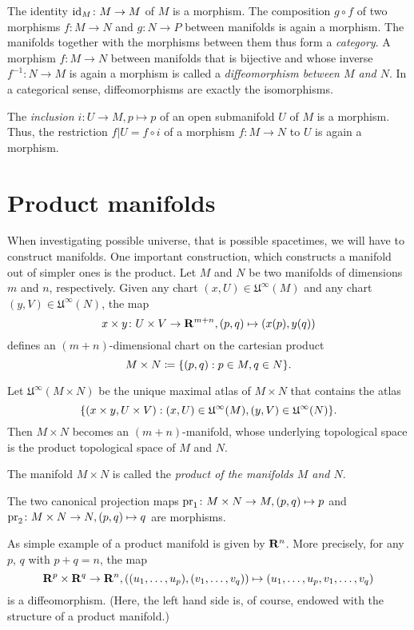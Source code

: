 The identity $\mathrm{id}_M\colon M \to M$ of $M$ is a morphism. The composition $g \circ f$
of two morphisms $f\colon M \to N$ and $g\colon N \to P$ between manifolds is
again a morphism. The manifolds together with the morphisms between them thus
form a \emph{category}. A morphism $f\colon M \to N$ between manifolds that
is bijective and whose inverse $f^{-1}\colon N \to M$ is again a morphism is
called a \emph{diffeomorphism between $M$ and $N$}. In a categorical sense,
diffeomorphisms are exactly the isomorphisms.

The \emph{inclusion $i\colon U \to M, p \mapsto p$} of an open submanifold $U$
of $M$ is a morphism. Thus, the restriction $f|U = f \circ i$ of a morphism
$f\colon M \to N$ to $U$ is again a morphism.

\section{Product manifolds}

When investigating possible universe, that is possible spacetimes, we will have
to construct manifolds. One important construction, which constructs a manifold
out of simpler ones is the product. Let $M$ and $N$ be two manifolds of dimensions
$m$ and $n$, respectively. Given any chart $(x, U) \in \mathfrak U^\infty(M)$
and any chart $(y, V) \in \mathfrak U^\infty(N)$, the map
\[
  x \times y\colon U \times V \to \mathbf{R}^{m + n}, (p, q) \mapsto (x(p), y(q))
\]
defines an $(m + n)$-dimensional chart on the cartesian product
\[
  M \times N \coloneqq \lbrace(p, q) : p \in M, q \in N\rbrace.
\]

Let $\mathfrak U^\infty(M \times N)$ be the unique maximal atlas of $M \times N$
that contains the atlas
\[
  \lbrace(x \times y, U \times V): (x, U) \in \mathfrak U^\infty(M),
    (y, V) \in \mathfrak U^\infty(N)\rbrace.
\]
Then $M \times N$ becomes an $(m + n)$-manifold, whose underlying topological 
space is the product topological space of $M$ and $N$.

\begin{dfn}
  The manifold $M \times N$ is called the \emph{product of the manifolds $M$
  and $N$}.
\end{dfn}

The two canonical projection maps $\mathrm{pr}_1\colon M \times N \to M, (p, q) \mapsto
p$ and $\mathrm{pr}_2\colon M \times N \to N, (p, q) \mapsto q$ are morphisms.

As simple example of a product manifold is given by $\mathbf{R}^n$. More precisely,
for any $p$, $q$ with $p + q = n$, the map
\[
  \mathbf{R}^p \times \mathbf{R}^q \to \mathbf{R}^n, ((u_1, \dotsc, u_p), (v_1, \dotsc, v_q))
  \mapsto (u_1, \dotsc, u_p, v_1, \dotsc, v_q)
\]
is a diffeomorphism. (Here, the left hand side is, of course, endowed with the
structure of a product manifold.)

